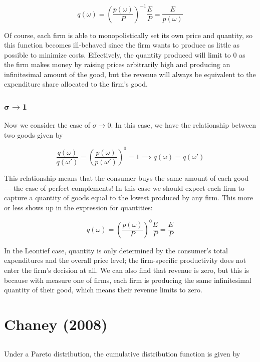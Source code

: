 \documentclass[12pt, letterpaper]{article}
\begin{document}
	\[q(\omega) = \left(\frac{p(\omega)}{P}\right)^{-1} \frac{E}{P} = \frac{E}{p(\omega)}\]

	Of course, each firm is able to monopolistically set its own price and quantity, so this function becomes ill-behaved since the firm wants to produce as little as possible to minimize costs. Effectively, the quantity produced will limit to \(0\) as the firm makes money by raising prices arbitrarily high and producing an infinitesimal amount of the good, but the revenue will always be equivalent to the expenditure share allocated to the firm's good.

	\subsubsection{\texorpdfstring{$\bm{\sigma \rightarrow 1}$}{R\textasciicircum n}}

	Now we consider the case of \(\sigma \rightarrow 0\). In this case, we have the relationship between two goods given by 

	\[ \frac{q(\omega)}{q(\omega')} = \left(\frac{p(\omega)}{p(\omega')}\right)^{0} = 1 \implies q(\omega) = q(\omega')    \]

	This relationship means that the consumer buys the same amount of each good --- the case of perfect complements! In this case we should expect each firm to capture a quantity of goods equal to the lowest produced by any firm. This more or less shows up in the expression for quantities:

	\[q(\omega) = \left(\frac{p(\omega)}{P}\right)^{0} \frac{E}{P} = \frac{E}{P}\]

	In the Leontief case, quantity is only determined by the consumer's total expenditures and the overall price level; the firm-specific productivity does not enter the firm's decision at all. We can also find that revenue is zero, but this is because with measure one of firms, each firm is producing the same infinitesimal quantity of their good, which means their revenue limits to zero.

    \section{Chaney (2008)}

    \subsection{}

    Under a Pareto distribution, the cumulative distribution function is given by
\end{document}
